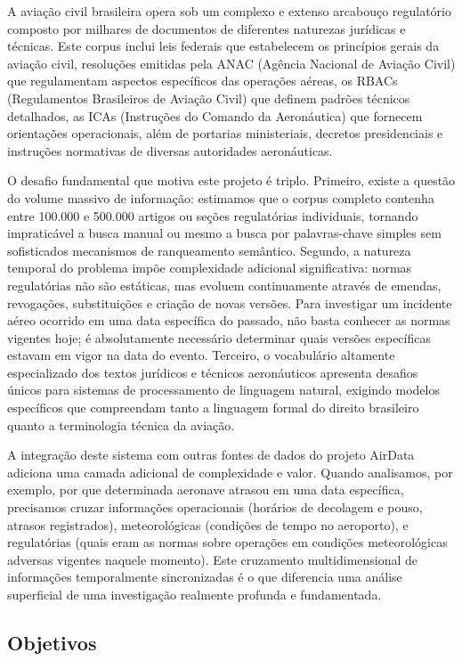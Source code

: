 \documentclass[12pt,a4paper]{article}
\begin{document}
A aviação civil brasileira opera sob um complexo e extenso arcabouço regulatório composto por milhares de documentos de diferentes naturezas jurídicas e técnicas. Este corpus inclui leis federais que estabelecem os princípios gerais da aviação civil, resoluções emitidas pela ANAC (Agência Nacional de Aviação Civil) que regulamentam aspectos específicos das operações aéreas, os RBACs (Regulamentos Brasileiros de Aviação Civil) que definem padrões técnicos detalhados, as ICAs (Instruções do Comando da Aeronáutica) que fornecem orientações operacionais, além de portarias ministeriais, decretos presidenciais e instruções normativas de diversas autoridades aeronáuticas.

O desafio fundamental que motiva este projeto é triplo. Primeiro, existe a questão do volume massivo de informação: estimamos que o corpus completo contenha entre 100.000 e 500.000 artigos ou seções regulatórias individuais, tornando impraticável a busca manual ou mesmo a busca por palavras-chave simples sem sofisticados mecanismos de ranqueamento semântico. Segundo, a natureza temporal do problema impõe complexidade adicional significativa: normas regulatórias não são estáticas, mas evoluem continuamente através de emendas, revogações, substituições e criação de novas versões. Para investigar um incidente aéreo ocorrido em uma data específica do passado, não basta conhecer as normas vigentes hoje; é absolutamente necessário determinar quais versões específicas estavam em vigor na data do evento. Terceiro, o vocabulário altamente especializado dos textos jurídicos e técnicos aeronáuticos apresenta desafios únicos para sistemas de processamento de linguagem natural, exigindo modelos específicos que compreendam tanto a linguagem formal do direito brasileiro quanto a terminologia técnica da aviação.

A integração deste sistema com outras fontes de dados do projeto AirData adiciona uma camada adicional de complexidade e valor. Quando analisamos, por exemplo, por que determinada aeronave atrasou em uma data específica, precisamos cruzar informações operacionais (horários de decolagem e pouso, atrasos registrados), meteorológicas (condições de tempo no aeroporto), e regulatórias (quais eram as normas sobre operações em condições meteorológicas adversas vigentes naquele momento). Este cruzamento multidimensional de informações temporalmente sincronizadas é o que diferencia uma análise superficial de uma investigação realmente profunda e fundamentada.

\subsection{Objetivos}
\end{document}
